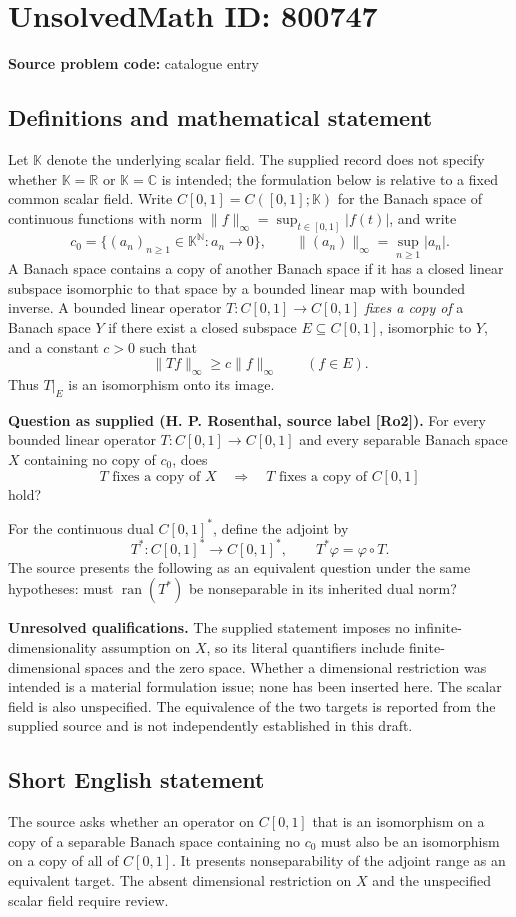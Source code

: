 \documentclass[11pt]{article}
\newcommand{\N}{\mathbb{N}}
\newcommand{\R}{\mathbb{R}}
\newcommand{\C}{\mathbb{C}}
\begin{document}
\section*{UnsolvedMath ID: 800747}
\textbf{Source problem code:} catalogue entry
\subsection{Definitions and mathematical statement}
Let \(\mathbb K\) denote the underlying scalar field. The supplied record does not specify whether \(\mathbb K=\R\) or \(\mathbb K=\C\) is intended; the formulation below is relative to a fixed common scalar field. Write \(C[0,1]=C([0,1];\mathbb K)\) for the Banach space of continuous functions with norm \(\|f\|_\infty=\sup_{t\in[0,1]}|f(t)|\), and write
\[
c_0=\{(a_n)_{n\geq1}\in\mathbb K^{\N}:a_n\longrightarrow0\},\qquad \|(a_n)\|_\infty=\sup_{n\geq1}|a_n|.
\]
A Banach space contains a copy of another Banach space if it has a closed linear subspace isomorphic to that space by a bounded linear map with bounded inverse. A bounded linear operator \(T:C[0,1]\to C[0,1]\) \emph{fixes a copy of} a Banach space \(Y\) if there exist a closed subspace \(E\subseteq C[0,1]\), isomorphic to \(Y\), and a constant \(c>0\) such that
\[
\|Tf\|_\infty\geq c\|f\|_\infty\qquad(f\in E).
\]
Thus \(T|_E\) is an isomorphism onto its image.

\textbf{Question as supplied (H. P. Rosenthal, source label [Ro2]).} For every bounded linear operator \(T:C[0,1]\to C[0,1]\) and every separable Banach space \(X\) containing no copy of \(c_0\), does
\[
T\text{ fixes a copy of }X
\quad\Longrightarrow\quad
T\text{ fixes a copy of }C[0,1]
\]
hold?

For the continuous dual \(C[0,1]^*\), define the adjoint by
\[
T^*:C[0,1]^*\longrightarrow C[0,1]^*,\qquad T^*\varphi=\varphi\circ T.
\]
The source presents the following as an equivalent question under the same hypotheses: must \(\operatorname{ran}(T^*)\) be nonseparable in its inherited dual norm?

\textbf{Unresolved qualifications.} The supplied statement imposes no infinite-dimensionality assumption on \(X\), so its literal quantifiers include finite-dimensional spaces and the zero space. Whether a dimensional restriction was intended is a material formulation issue; none has been inserted here. The scalar field is also unspecified. The equivalence of the two targets is reported from the supplied source and is not independently established in this draft.
\subsection{Short English statement}
The source asks whether an operator on \(C[0,1]\) that is an isomorphism on a copy of a separable Banach space containing no \(c_0\) must also be an isomorphism on a copy of all of \(C[0,1]\). It presents nonseparability of the adjoint range as an equivalent target. The absent dimensional restriction on \(X\) and the unspecified scalar field require review.
\end{document}
